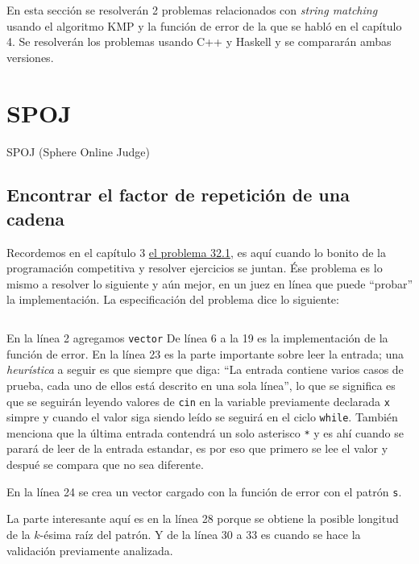 \label{chap:jueces}

En esta sección se resolverán 2 problemas relacionados con \textit{string matching} usando el
algoritmo KMP y la función de error de la que se habló en el capítulo 4. Se resolverán los
problemas usando C++ y Haskell y se compararán ambas versiones.


\section{SPOJ}
SPOJ (Sphere Online Judge)

\subsection{Encontrar el factor de repetición de una cadena}
Recordemos en el capítulo 3 \hyperlink{repetition_factor}{el problema 32.1}, es aquí cuando lo
bonito de la programación competitiva y resolver ejercicios se juntan. Ése problema es lo mismo
a resolver lo siguiente y aún mejor, en un juez en línea que puede ``probar'' la implementación.
La especificación del problema dice lo siguiente: 




\inputminted[linenos, frame=lines]{cpp}{problemas/cpp/FINDSR.cpp}
\pagebreak

En la línea 2 agregamos \texttt{vector} %
De línea 6 a la 19 es la implementación de la función de error.
En la línea 23 es la parte importante sobre leer la entrada; una \textit{heurística} a seguir es que
siempre que diga: ``La entrada contiene varios casos de prueba, cada uno de ellos está descrito en una sola línea'', lo 
que se significa es que se seguirán leyendo valores de \texttt{cin} en la variable previamente declarada \texttt{x} simpre y cuando
el valor siga siendo leído se seguirá en el ciclo \texttt{while}.
También menciona que la última entrada contendrá un solo asterisco \texttt{*} y es ahí cuando se parará de leer de la entrada estandar,
es por eso que primero se lee el valor y despué se compara que no sea diferente.

En la línea 24 se crea un vector cargado con la función de error con el patrón \texttt{s}.

La parte interesante aquí es en la línea 28 porque se obtiene la posible longitud de la $k$-ésima
raíz del patrón. Y de la línea 30 a 33 es cuando se hace la validación previamente analizada.

